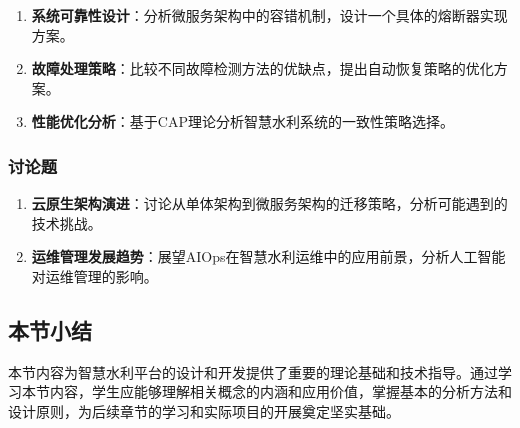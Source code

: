 \begin{enumerate}
\def\labelenumi{\arabic{enumi}.}
\setcounter{enumi}{3}
\tightlist
\item
  \textbf{系统可靠性设计}：分析微服务架构中的容错机制，设计一个具体的熔断器实现方案。
\item
  \textbf{故障处理策略}：比较不同故障检测方法的优缺点，提出自动恢复策略的优化方案。
\item
  \textbf{性能优化分析}：基于CAP理论分析智慧水利系统的一致性策略选择。
\end{enumerate}

\subsubsection{讨论题}\label{ux8ba8ux8bbaux9898}

\begin{enumerate}
\def\labelenumi{\arabic{enumi}.}
\setcounter{enumi}{6}
\tightlist
\item
  \textbf{云原生架构演进}：讨论从单体架构到微服务架构的迁移策略，分析可能遇到的技术挑战。
\item
  \textbf{运维管理发展趋势}：展望AIOps在智慧水利运维中的应用前景，分析人工智能对运维管理的影响。
\end{enumerate}

\subsection{本节小结}\label{ux672cux8282ux5c0fux7ed3}

本节内容为智慧水利平台的设计和开发提供了重要的理论基础和技术指导。通过学习本节内容，学生应能够理解相关概念的内涵和应用价值，掌握基本的分析方法和设计原则，为后续章节的学习和实际项目的开展奠定坚实基础。
